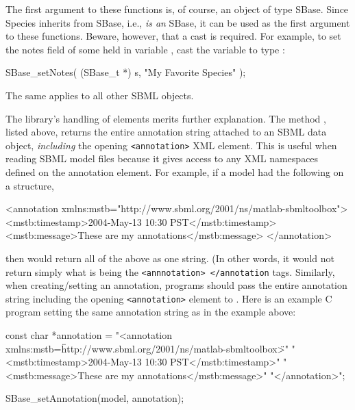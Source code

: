 \documentclass{sbmlmanual}
\begin{document}
The first argument to these functions is, of course, an object of type
SBase.  Since Species inherits from SBase, i.e., 
\emph{is an} SBase, it can be used as the first argument to these
functions.  Beware, however, that a cast is required.  For example, to set
the notes field of some  held in variable , cast
the variable to type :

\begin{cVerbatim}
  SBase_setNotes( (SBase_t *) s, "My Favorite Species" );
\end{cVerbatim}

The same applies to all other SBML objects.

The \libsbml{} library's handling of  elements merits
further explanation.  The method , listed
above, returns the entire annotation string attached to an SBML data
object, \emph{including} the opening \texttt{<annotation>} XML element.
This is useful when reading SBML model files because it gives access to any
XML namespaces defined on the annotation element.  For example, if a model
had the following on a structure,

\begin{xmlVerbatim}
  <annotation xmlns:mstb="http://www.sbml.org/2001/ns/matlab-sbmltoolbox">
    <mstb:timestamp>2004-May-13 10:30 PST</mstb:timestamp>
    <mstb:message>These are my annotations</mstb:message>
  </annotation>
\end{xmlVerbatim}

then  would return all of the above as one
string.  (In other words, it would not return simply what is being the
\texttt{<annnotation> </annotation} tags.  Similarly, when creating/setting
an annotation, programs should pass the entire annotation string including
the opening \texttt{<annotation>} element to
.  Here is an example C program setting the
same annotation string as in the example above:

\begin{cVerbatim}
  const char *annotation =
      "<annotation xmlns:mstb=\"http://www.sbml.org/2001/ns/matlab-sbmltoolbox\">"
      "  <mstb:timestamp>2004-May-13 10:30 PST</mstb:timestamp>\n"
      "  <mstb:message>These are my annotations</mstb:message>\n"
      "</annotation>";
  
  SBase_setAnnotation(model, annotation);
\end{cVerbatim}
\end{document}
